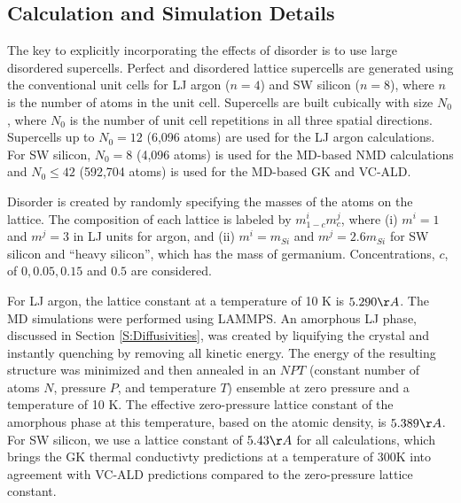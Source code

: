 \documentclass[aps,prb,onecolumn,preprint,footinbib,superscriptaddress,amsmath,amssymb,floatfix]{revtex4}
\begin{document}
\clearpage

\subsection{\label{S:Calculation}Calculation and Simulation Details}

The key to explicitly incorporating the effects of disorder 
is to use large disordered supercells. 
Perfect and disordered lattice supercells are generated using the 
conventional unit cells for LJ argon ($n=4$) and 
SW silicon ($n=8$), where $n$ is the number of atoms 
in the unit cell. 
Supercells are built cubically with size $N_0$, where $N_0$ is the 
number of unit cell repetitions in all three  
spatial directions. Supercells up to $N_0 = 12$ 
(6,096 atoms) are used for the LJ argon calculations. For SW silicon, 
$N_0 = 8$ (4,096 atoms) is used for 
the MD-based NMD calculations and $N_0 \le 42$ (592,704 atoms) 
is used for the MD-based GK and VC-ALD.  

Disorder is created by randomly specifying the masses of the atoms 
on the lattice. 
The composition of each lattice is labeled by $m^i_{1-c}m^j_{c}$,  
where (i) $m^i=1$ and $m^j=3$ in 
LJ units for argon, and (ii) $m^i=m_{Si}$ and $m^j=2.6m_{Si}$ 
for SW silicon and ``heavy silicon'', which has the mass of germanium. 
Concentrations, $c$, of $0,0.05,0.15$ and $0.5$ are considered. 

For LJ argon, the lattice constant 
at a temperature of 10 K is $5.290 \AA$.\cite{mcgaughey_phonon_2004} 
The MD simulations were performed using LAMMPS.\cite{plimpton_fast_1995} 
An amorphous LJ phase, discussed in Section \ref{S:Diffusivities}, 
was created by liquifying the crystal 
and instantly quenching by removing all kinetic energy.  The energy 
of the resulting structure was minimized and then annealed in an 
$NPT$ (constant number of atoms $N$, pressure $P$, and temperature $T$) 
ensemble at zero pressure and a temperature of 10 K.  
The effective zero-pressure lattice constant  
of the amorphous phase at this temperature, based on the atomic 
density, is $5.389 \AA$.\cite{mcgaughey_phonon_2004} 
For SW silicon, we use a lattice constant of $5.43 \AA$ 
for all calculations, which brings the GK thermal conductivty 
predictions at a temperature of 300K
\cite{goicochea_thermal_2010,he_lattice_2012} 
into agreement with VC-ALD predictions\cite{sellan_cross-plane_2010} 
compared to the zero-pressure lattice constant. 
\end{document}

